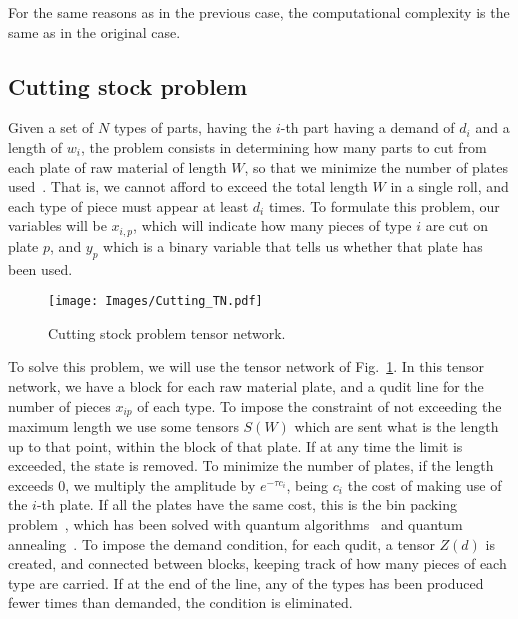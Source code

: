 For the same reasons as in the previous case, the computational complexity is the same as in the original case.


\subsection{Cutting stock problem}
Given a set of $N$ types of parts, having the $i$-th part having a demand of $d_i$ and a length of $w_i$, the problem consists in determining how many parts to cut from each plate of raw material of length $W$, so that we minimize the number of plates used~\cite{Cutting_Stock}. That is, we cannot afford to exceed the total length $W$ in a single roll, and each type of piece must appear at least $d_i$ times. To formulate this problem, our variables will be $x_{i,p}$, which will indicate how many pieces of type $i$ are cut on plate $p$, and $y_p$ which is a binary variable that tells us whether that plate has been used.

\begin{figure}[h]
    \centering
    \texttt{[image: Images/Cutting\_TN.pdf]}
    \caption{Cutting stock problem tensor network.}
    \label{fig: Cutting stock}
\end{figure}

To solve this problem, we will use the tensor network of Fig.~\ref{fig: Cutting stock}. In this tensor network, we have a block for each raw material plate, and a qudit line for the number of pieces $x_{ip}$ of each type. To impose the constraint of not exceeding the maximum length we use some tensors $S(W)$ which are sent what is the length up to that point, within the block of that plate. If at any time the limit is exceeded, the state is removed. To minimize the number of plates, if the length exceeds 0, we multiply the amplitude by $e^{-\tau c_i}$, being $c_i$ the cost of making use of the $i$-th plate. If all the plates have the same cost, this is the bin packing problem~\cite{Bin_Packing,Bin_packing_aprox}, which has been solved with quantum algorithms~\cite{Bin_Packing_Quantum,Bin_Packing_Quantum_Bench} and quantum annealing~\cite{Bin_Packing_Annealer,Bin_Packing_Annealer_3D}. To impose the demand condition, for each qudit, a tensor $Z(d)$ is created, and connected between blocks, keeping track of how many pieces of each type are carried. If at the end of the line, any of the types has been produced fewer times than demanded, the condition is eliminated.

